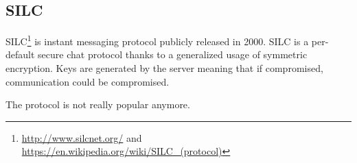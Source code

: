 \subsection{SILC}

SILC\footnote{\url{http://www.silcnet.org/} and
\url{https://en.wikipedia.org/wiki/SILC_(protocol)}} is instant messaging
protocol publicly released in 2000. SILC is a per-default secure chat protocol
thanks to a generalized usage of symmetric encryption. Keys are generated by
the server meaning that if compromised, communication could be compromised.

The protocol is not really popular anymore.

